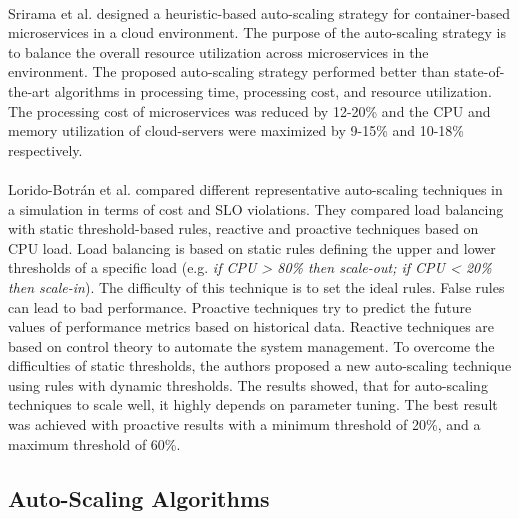 \paragraph{}
Srirama et al. \cite{Srirama2020AppDeplyCont} designed a heuristic-based auto-scaling strategy for container-based microservices in a cloud environment. The purpose of the auto-scaling strategy is to balance the overall resource utilization across microservices in the environment.
The proposed auto-scaling strategy performed better than state-of-the-art algorithms in processing time, processing cost, and resource utilization. The processing cost of microservices was reduced by 12-20\% and the CPU and memory utilization of cloud-servers were maximized by 9-15\% and 10-18\% respectively.


\paragraph{}
Lorido-Botrán et al.  \cite{Botran2013AutoScalingComp} compared different representative auto-scaling techniques in a simulation in terms of cost and SLO violations. They compared load balancing with static threshold-based rules, reactive and proactive techniques based on CPU load.
Load balancing is based on static rules defining the upper and lower thresholds of a specific load (e.g. \textit{if CPU > 80\% then scale-out; if CPU < 20\% then scale-in}). The difficulty of this technique is to set the ideal rules. False rules can lead to bad performance. Proactive techniques try to predict the future values of performance metrics based on historical data. Reactive techniques are based on control theory to automate the system management. To overcome the difficulties of static thresholds, the authors proposed a new auto-scaling technique using rules with dynamic thresholds. The results showed, that for auto-scaling techniques to scale well, it highly depends on parameter tuning. The best result was achieved with proactive results with a minimum threshold of 20\%, and a maximum threshold of 60\%.


\subsection{Auto-Scaling Algorithms}

